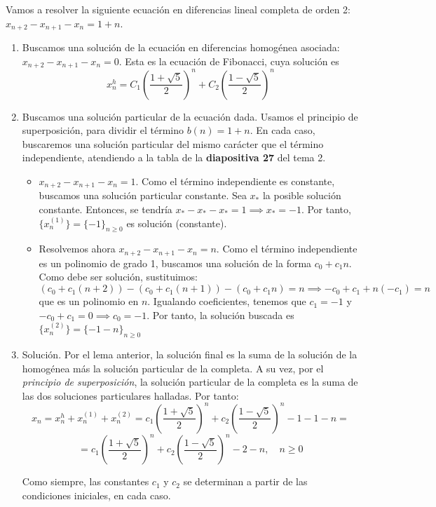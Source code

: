 \begin{ejemplo}
	Vamos a resolver la siguiente ecuación en diferencias lineal completa de orden 2: $x _{n+2} - x _{n+1}  - x_n = 1+n$.
	\begin{enumerate}
	\item Buscamos una solución de la ecuación en diferencias homogénea asociada:\\ $x _{n+2} - x _{n+1} - x_n = 0$. Esta es la ecuación de Fibonacci, cuya solución es $$x_n^h = C_1\left(\frac{1+ \sqrt 5}{2}\right)^n + C_2 \left( \frac{1-\sqrt 5}{2}\right)^n$$
	\item Buscamos una solución particular de la ecuación dada.  Usamos el principio de superposición, para dividir el término $b(n)=1+n$. En cada caso, buscaremos una solución particular del mismo carácter que el término independiente, atendiendo a la tabla de la \textbf{diapositiva 27} del tema 2.

\begin{itemize}
	\item $x _{n+2} - x_{n+1} - x_n = 1$. Como el término independiente es constante, buscamos una solución particular constante. Sea $x_*$ la posible solución constante. Entonces, se tendría $x_* - x_* - x_* = 1 \implies x_* = -1$. Por tanto,\\ $\{x_n^{(1)}\} = \{-1\}_{n\ge0}$ es solución (constante).

	\item Resolvemos ahora $x _{n+2} - x _{n+1} - x_n = n$. Como el término independiente es un polinomio de grado 1, buscamos una solución de la forma $c_0 + c_1 n$. Como debe ser solución, sustituimos:
	\[
	(c_0 + c_1(n+2)) -(c_0 + c_1(n+1)) - (c_0 + c_1 n) = n \implies -c_0 + c_1 +n(-c_1) = n
	\] que es un polinomio en $n$. Igualando coeficientes, tenemos que $c_1 = -1 $ y $-c_0 + c_1 = 0 \implies c_0 = -1$. Por tanto, la solución buscada es\\ $\{x_n^{(2)}\} = \{-1 - n\}_{n\ge0}$
\end{itemize}



	\item Solución. Por el lema anterior, la solución final es la suma de la solución de la homogénea más la solución particular de la completa. A su vez, por el \textit{principio de superposición}, la solución particular de la completa es la suma de las dos soluciones particulares halladas. Por tanto:
	\[
	x_n = x_n^h + x_n^{(1)} +  x_n^{(2)} =  c_1\left(\frac{1+ \sqrt 5}{2}\right)^n + c_2 \left(\frac{1-\sqrt 5}{2}\right)^n -1-1-n =
	\]
	\[
	=  c_1\left(\frac{1+ \sqrt 5}{2}\right)^n + c_2 \left(\frac{1-\sqrt 5}{2}\right)^n -2 - n, \quad n \ge 0
	\]

	Como siempre, las constantes $c_1$ y $c_2$ se determinan a partir de las condiciones iniciales, en cada caso.
\end{enumerate}
\end{ejemplo}


